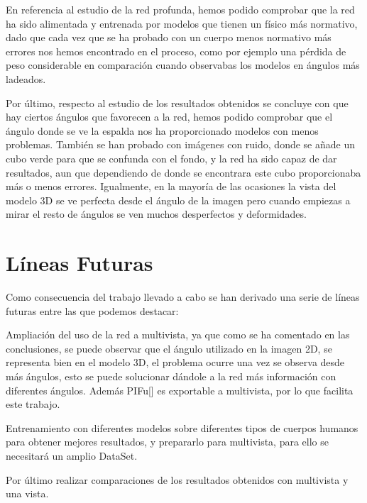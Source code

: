 En referencia al estudio de la red profunda, hemos podido comprobar que la red ha sido alimentada y entrenada por modelos que tienen un físico más normativo, dado que cada vez que se ha probado con un cuerpo menos normativo más errores nos hemos encontrado en el proceso, como por ejemplo una pérdida de peso considerable en comparación cuando observabas los modelos en ángulos más ladeados.

Por último, respecto al estudio de los resultados obtenidos se concluye con que hay ciertos ángulos que favorecen a la red, hemos podido comprobar que el ángulo donde se ve la espalda nos ha proporcionado modelos con menos problemas. También se han probado con imágenes con ruido, donde se añade un cubo verde para que se confunda con el fondo, y la red ha sido capaz de dar resultados, aun que dependiendo de donde se encontrara este cubo proporcionaba más o menos errores. Igualmente, en la mayoría de las ocasiones la vista del modelo 3D se ve perfecta desde el ángulo de la imagen pero cuando empiezas a mirar el resto de ángulos se ven muchos desperfectos y deformidades.

\clearpage
\section{Líneas Futuras}

Como consecuencia del trabajo llevado a cabo se han derivado una serie de líneas futuras entre las que podemos destacar:

Ampliación del uso de la red a multivista, ya que como se ha comentado en las conclusiones, se puede observar que el ángulo utilizado en la imagen 2D, se representa bien en el modelo 3D, el problema ocurre una vez se observa desde más ángulos, esto se puede solucionar dándole a la red más información con diferentes ángulos. Además PIFu[\cite{pifu}] es exportable a multivista, por lo que facilita este trabajo.

Entrenamiento con diferentes modelos sobre diferentes tipos de cuerpos humanos para obtener mejores resultados, y prepararlo para multivista, para ello se necesitará un amplio DataSet.

Por último realizar comparaciones de los resultados obtenidos con multivista y una vista.
